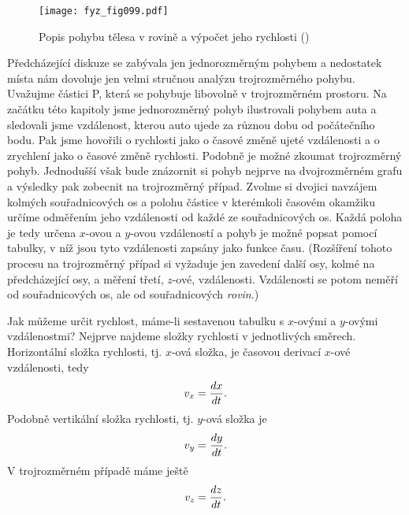     \begin{figure}[ht!]  %
      \centering
      \texttt{[image: fyz\_fig099.pdf]}
      \caption{Popis pohybu tělesa v rovině a výpočet jeho rychlosti
               (\cite[s.~118]{Feynman01})}
      \label{fyz:fig099}
    \end{figure}
    Předcházející diskuze se zabývala jen jednorozměrným pohybem a nedostatek místa nám dovoluje 
    jen velmi stručnou analýzu trojrozměrného pohybu. Uvažujme částici P, která se pohybuje 
    libovolně v trojrozměrném prostoru. Na začátku této kapitoly jsme jednorozměrný pohyb 
    ilustrovali pohybem auta a sledovali jsme vzdálenost, kterou auto ujede za různou dobu od 
    počátečního bodu. Pak jsme hovořili o rychlosti jako o časové změně ujeté vzdálenosti a o 
    zrychlení jako o časové změně rychlosti. Podobně je možné zkoumat trojrozměrný pohyb. 
    Jednodušší však bude znázornit si pohyb nejprve na dvojrozměrném grafu a výsledky pak zobecnit 
    na trojrozměrný případ. Zvolme si dvojici navzájem kolmých souřadnicových os a polohu částice v 
    kterémkoli časovém okamžiku určíme odměřením jeho vzdálenosti od každé ze souřadnicových os. 
    Každá poloha je tedy určena \(x\)-ovou a \(y\)-ovou vzdáleností a pohyb je možné popsat pomocí 
    tabulky, v níž jsou tyto vzdálenosti zapsány jako funkce času. (Rozšíření tohoto procesu na 
    trojrozměrný případ si vyžaduje jen zavedení další osy, kolmé na předcházející osy, a měření 
    třetí, \(z\)-ové, vzdálenosti. Vzdálenosti se potom neměří od souřadnicových os, ale od 
    souřadnicových \emph{rovin}.)
    
    Jak můžeme určit rychlost, máme-li sestavenou tabulku s \(x\)-ovými a \(y\)-ovými vzdálenostmi? 
    Nejprve najdeme složky rychlosti v jednotlivých směrech. Horizontální složka rychlosti, tj. 
    \(x\)-ová složka, je časovou derivací \(x\)-ové vzdálenosti, tedy
    \begin{equation}\label{fyz:eq106}
      v_x = \dfrac{d x}{d t}.
    \end{equation}
    Podobně vertikální složka rychlosti, tj. \(y\)-ová složka je
    \begin{equation}\label{fyz:eq108}
      v_y = \dfrac{d y}{d t}.
    \end{equation}
    V trojrozměrném případě máme ještě
    \begin{equation}\label{fyz:eq107}
      v_z = \dfrac{d z}{d t}.
    \end{equation}
    
